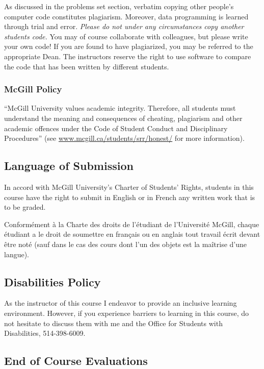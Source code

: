 \documentclass[11pt]{article}
\begin{document}
As discussed in the problems set section, verbatim copying other
people's computer code constitutes plagiarism. Moreover, data
programming is learned through trial and error. \emph{Please do not
under any circumstances copy another students code.} You may of course
collaborate with colleagues, but please write your own code! If you are
found to have plagiarized, you may be referred to the appropriate Dean.
The instructors reserve the right to use software to compare the code
that has been written by different students.

\subsubsection*{McGill Policy}

``McGill University values academic integrity. Therefore, all students
must understand the meaning and consequences of cheating, plagiarism and
other academic offences under the Code of Student Conduct and
Disciplinary Procedures'' (see \url{www.mcgill.ca/students/srr/honest/}
for more information).

\subsection*{Language of Submission}

In accord with McGill University's Charter of Students' Rights, students
in this course have the right to submit in English or in French any
written work that is to be graded.

Conformément à la Charte des droits de l’étudiant de l’Université McGill, chaque étudiant a le droit de soumettre en français ou en anglais tout travail écrit devant être noté (sauf dans le cas des cours dont l’un des objets est la maîtrise d’une langue).

\subsection*{Disabilities Policy}

As the instructor of this course I endeavor to provide an inclusive
learning environment. However, if you experience barriers to learning in
this course, do not hesitate to discuss them with me and the Office for
Students with Disabilities, 514-398-6009.

\subsection*{End of Course Evaluations}
\end{document}
